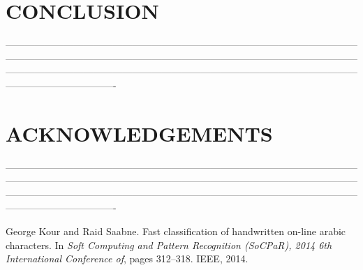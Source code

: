 \documentclass{article}
\begin{document}
\section{CONCLUSION}
----------------------------------------------------------------------------------------------------------------------------------------------------------------------------------------------------------------------------------------------------------------------------------------------------------------------------------------------------------------------


\section{ACKNOWLEDGEMENTS}
----------------------------------------------------------------------------------------------------------------------------------------------------------------------------------------------------------------------------------------------------------------------------------------------------------------------------------------------------------------------





\begin{thebibliography}{1}

George Kour and Raid Saabne.
\newblock Fast classification of handwritten on-line arabic characters.
\newblock In {\em Soft Computing and Pattern Recognition (SoCPaR), 2014 6th
  International Conference of}, pages 312--318. IEEE, 2014.


\end{thebibliography}
\end{document}
